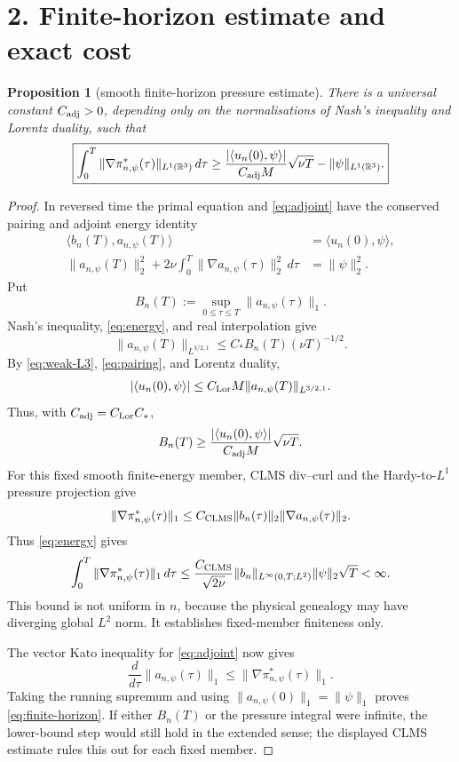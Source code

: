 \documentclass[11pt]{article}
\newcommand{\R}{\mathbb R}
\newcommand{\LorentzDual}{L^{3/2,1}}
\newtheorem{proposition}{Proposition}
\begin{document}
\section*{2. Finite-horizon estimate and exact cost}

\begin{proposition}[smooth finite-horizon pressure estimate]
\label{prop:finite-horizon}
There is a universal constant \(C_{\rm adj}>0\), depending only on the
normalisations of Nash's inequality and Lorentz duality, such that
\begin{equation}
  \boxed{
  \int_0^T
  \|\nabla\pi^*_{n,\psi}(\tau)\|_{L^1(\R^3)}\,d\tau
  \ge
  \frac{|\langle u_n(0),\psi\rangle|}
       {C_{\rm adj}M}\sqrt{\nu T}
  -\|\psi\|_{L^1(\R^3)} .}
  \label{eq:finite-horizon}
\end{equation}
\end{proposition}

\begin{proof}
In reversed time the primal equation and \eqref{eq:adjoint} have the
conserved pairing and adjoint energy identity
\begin{align}
  \langle b_n(T),a_{n,\psi}(T)\rangle
    &=\langle u_n(0),\psi\rangle,
    \label{eq:pairing}\\
  \|a_{n,\psi}(T)\|_2^2
  +2\nu\int_0^T\|\nabla a_{n,\psi}(\tau)\|_2^2\,d\tau
    &=\|\psi\|_2^2.
    \label{eq:energy}
\end{align}
Put
\[
  B_n(T):=\sup_{0\le\tau\le T}\|a_{n,\psi}(\tau)\|_1.
\]
Nash's inequality, \eqref{eq:energy}, and real interpolation give
\[
  \|a_{n,\psi}(T)\|_{\LorentzDual}
  \le C_* B_n(T)(\nu T)^{-1/2}.
\]
By \eqref{eq:weak-L3}, \eqref{eq:pairing}, and Lorentz duality,
\[
  |\langle u_n(0),\psi\rangle|
  \le C_{\rm Lor}M
      \|a_{n,\psi}(T)\|_{\LorentzDual}.
\]
Thus, with \(C_{\rm adj}=C_{\rm Lor}C_*\),
\[
  B_n(T)
  \ge
  \frac{|\langle u_n(0),\psi\rangle|}
       {C_{\rm adj}M}\sqrt{\nu T}.
\]
For this fixed smooth finite-energy member, CLMS div--curl and the
Hardy-to-\(L^1\) pressure projection give
\[
  \|\nabla\pi^*_{n,\psi}(\tau)\|_1
  \le C_{\rm CLMS}
      \|b_n(\tau)\|_2
      \|\nabla a_{n,\psi}(\tau)\|_2.
\]
Thus \eqref{eq:energy} gives
\[
  \int_0^T\|\nabla\pi^*_{n,\psi}(\tau)\|_1\,d\tau
  \le
  \frac{C_{\rm CLMS}}{\sqrt{2\nu}}
  \|b_n\|_{L^\infty(0,T;L^2)}
  \|\psi\|_2\sqrt T
  <\infty.
\]
This bound is not uniform in \(n\), because the physical genealogy may
have diverging global \(L^2\) norm.  It establishes fixed-member
finiteness only.

The vector Kato inequality for \eqref{eq:adjoint} now gives
\[
  \frac{d}{d\tau}\|a_{n,\psi}(\tau)\|_1
  \le\|\nabla\pi^*_{n,\psi}(\tau)\|_1.
\]
Taking the running supremum and using
\(\|a_{n,\psi}(0)\|_1=\|\psi\|_1\) proves
\eqref{eq:finite-horizon}.  If either \(B_n(T)\) or the pressure integral
were infinite, the lower-bound step would still hold in the extended
sense; the displayed CLMS estimate rules this out for each fixed member.
\end{proof}
\end{document}
